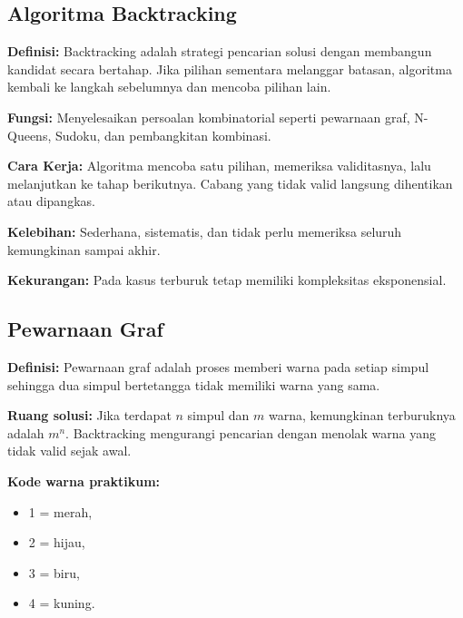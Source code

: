 \subsection{Algoritma Backtracking}
\textbf{Definisi:} Backtracking adalah strategi pencarian solusi dengan membangun kandidat secara bertahap. Jika pilihan sementara melanggar batasan, algoritma kembali ke langkah sebelumnya dan mencoba pilihan lain.

\textbf{Fungsi:} Menyelesaikan persoalan kombinatorial seperti pewarnaan graf, N-Queens, Sudoku, dan pembangkitan kombinasi.

\textbf{Cara Kerja:} Algoritma mencoba satu pilihan, memeriksa validitasnya, lalu melanjutkan ke tahap berikutnya. Cabang yang tidak valid langsung dihentikan atau dipangkas.

\textbf{Kelebihan:} Sederhana, sistematis, dan tidak perlu memeriksa seluruh kemungkinan sampai akhir.

\textbf{Kekurangan:} Pada kasus terburuk tetap memiliki kompleksitas eksponensial.

\subsection{Pewarnaan Graf}
\textbf{Definisi:} Pewarnaan graf adalah proses memberi warna pada setiap simpul sehingga dua simpul bertetangga tidak memiliki warna yang sama.

\textbf{Ruang solusi:} Jika terdapat $n$ simpul dan $m$ warna, kemungkinan terburuknya adalah $m^n$. Backtracking mengurangi pencarian dengan menolak warna yang tidak valid sejak awal.

\textbf{Kode warna praktikum:}
\begin{itemize}
    \item 1 = merah,
    \item 2 = hijau,
    \item 3 = biru,
    \item 4 = kuning.
\end{itemize}
